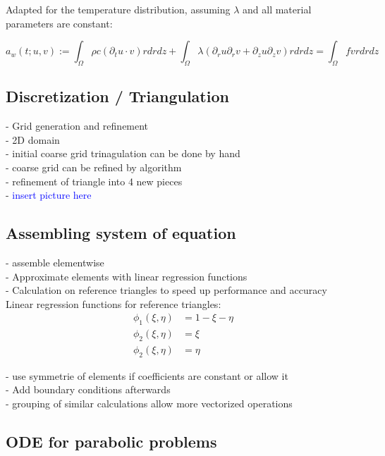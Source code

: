 \documentclass[parskip=half, titlepage=yes, 12pt, BCOR=12mm, DIV=calc]{scrartcl}
\begin{document}
Adapted for the temperature distribution, assuming $\lambda$ and all material parameters are constant: 

\begin{equation}
    a_w(t;u,v) := \int_{\Omega} \rho c (\partial_t u \cdot v) r drdz + \int_{\Omega} \lambda (\partial_r u \partial_r v + \partial_z u \partial_z v) r drdz = \int_{\Omega} f v r dr dz
\end{equation}

\newpage


\subsection{Discretization / Triangulation}

- Grid generation and refinement \\
- 2D domain \\
- initial coarse grid trinagulation can be done by hand \\
- coarse grid can be refined by algorithm \\

- refinement of triangle into 4 new pieces \\
- \textcolor{blue}{insert picture here}

\subsection{Assembling system of equation}

- assemble elementwise \\
- Approximate elements with linear regression functions\\
- Calculation on reference triangles to speed up performance and accuracy \\

Linear regression functions for reference triangles:
\begin{align}
    \phi_1(\xi, \eta) &= 1 - \xi - \eta \\
    \phi_2(\xi, \eta) &= \xi \\
    \phi_2(\xi, \eta) &= \eta 
\end{align}

- use symmetrie of elements if coefficients are constant or allow it \\
- Add boundary conditions afterwards \\
- grouping of similar calculations allow more vectorized operations \\ 

\subsection{ODE for parabolic problems}
\end{document}

